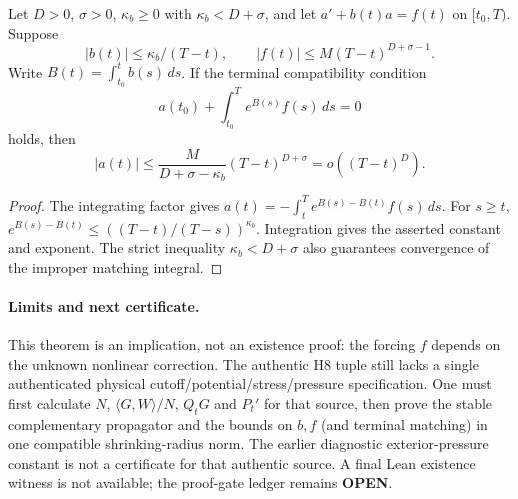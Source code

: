 \begin{theorem}
Let $D>0$, $\sigma>0$, $\kappa_b\ge0$ with
$\kappa_b<D+\sigma$, and let $a'+b(t)a=f(t)$ on $[t_0,T)$.
Suppose
\[
|b(t)|\le\kappa_b/(T-t),\qquad
|f(t)|\le M(T-t)^{D+\sigma-1}.
\]
Write $B(t)=\int_{t_0}^t b(s)\,ds$. If the terminal compatibility
condition
\[
 a(t_0)+\int_{t_0}^T e^{B(s)}f(s)\,ds=0
\]
holds, then
\[
 |a(t)|\le\frac{M}{D+\sigma-\kappa_b}(T-t)^{D+\sigma}
 =o((T-t)^D).
\]
\end{theorem}
\begin{proof}
The integrating factor gives
$a(t)=-\int_t^T e^{B(s)-B(t)}f(s)\,ds$. For $s\ge t$,
$e^{B(s)-B(t)}\le((T-t)/(T-s))^{\kappa_b}$.
Integration gives the asserted constant and exponent. The strict inequality $\kappa_b<D+\sigma$ also guarantees convergence of the improper matching integral.
\end{proof}

\paragraph{Limits and next certificate.}
This theorem is an implication, not an existence proof: the forcing $f$ depends on the unknown nonlinear correction. The authentic H8 tuple still lacks a single authenticated physical cutoff/potential/stress/pressure specification. One must first calculate $N$, $\langle G,W\rangle/N$, $Q_tG$ and $P_t'$ for that source, then prove the stable complementary propagator and the bounds on $b,f$ (and terminal matching) in one compatible shrinking-radius norm. The earlier diagnostic exterior-pressure constant is not a certificate for that authentic source. A final Lean existence witness is not available; the proof-gate ledger remains \textbf{OPEN}.